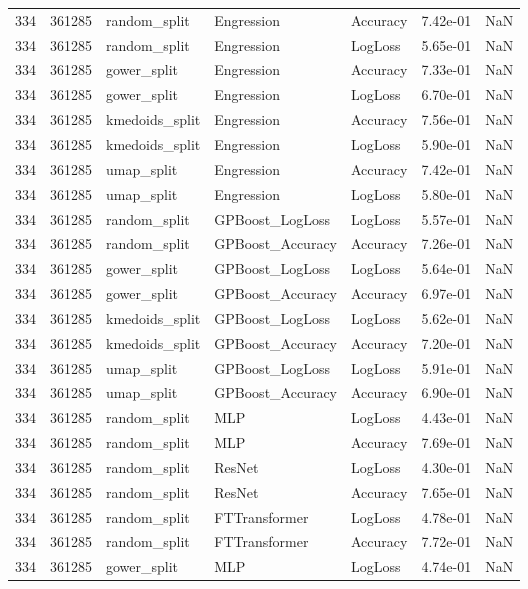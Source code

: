 \begin{tabular}{rrlllrr}
334 & 361285 & random\_split & Engression & Accuracy & 7.42e-01 & NaN \\
334 & 361285 & random\_split & Engression & LogLoss & 5.65e-01 & NaN \\
334 & 361285 & gower\_split & Engression & Accuracy & 7.33e-01 & NaN \\
334 & 361285 & gower\_split & Engression & LogLoss & 6.70e-01 & NaN \\
334 & 361285 & kmedoids\_split & Engression & Accuracy & 7.56e-01 & NaN \\
334 & 361285 & kmedoids\_split & Engression & LogLoss & 5.90e-01 & NaN \\
334 & 361285 & umap\_split & Engression & Accuracy & 7.42e-01 & NaN \\
334 & 361285 & umap\_split & Engression & LogLoss & 5.80e-01 & NaN \\
334 & 361285 & random\_split & GPBoost\_LogLoss & LogLoss & 5.57e-01 & NaN \\
334 & 361285 & random\_split & GPBoost\_Accuracy & Accuracy & 7.26e-01 & NaN \\
334 & 361285 & gower\_split & GPBoost\_LogLoss & LogLoss & 5.64e-01 & NaN \\
334 & 361285 & gower\_split & GPBoost\_Accuracy & Accuracy & 6.97e-01 & NaN \\
334 & 361285 & kmedoids\_split & GPBoost\_LogLoss & LogLoss & 5.62e-01 & NaN \\
334 & 361285 & kmedoids\_split & GPBoost\_Accuracy & Accuracy & 7.20e-01 & NaN \\
334 & 361285 & umap\_split & GPBoost\_LogLoss & LogLoss & 5.91e-01 & NaN \\
334 & 361285 & umap\_split & GPBoost\_Accuracy & Accuracy & 6.90e-01 & NaN \\
334 & 361285 & random\_split & MLP & LogLoss & 4.43e-01 & NaN \\
334 & 361285 & random\_split & MLP & Accuracy & 7.69e-01 & NaN \\
334 & 361285 & random\_split & ResNet & LogLoss & 4.30e-01 & NaN \\
334 & 361285 & random\_split & ResNet & Accuracy & 7.65e-01 & NaN \\
334 & 361285 & random\_split & FTTransformer & LogLoss & 4.78e-01 & NaN \\
334 & 361285 & random\_split & FTTransformer & Accuracy & 7.72e-01 & NaN \\
334 & 361285 & gower\_split & MLP & LogLoss & 4.74e-01 & NaN \\

\end{tabular}
